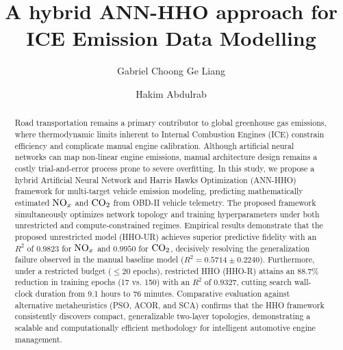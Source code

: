 \documentclass[runningheads]{llncs}
\begin{document}
\title{A hybrid ANN-HHO approach for ICE Emission Data Modelling}

\author{Gabriel Choong Ge Liang \and
Hakim Abdulrab}



\maketitle

\begin{abstract}
	Road transportation remains a primary contributor to global greenhouse gas emissions, where
	thermodynamic limits inherent to Internal Combustion Engines (ICE) constrain efficiency and
	complicate manual engine calibration. Although artificial neural networks can map non-linear
	engine emissions, manual architecture design remains a costly trial-and-error process prone
	to severe overfitting. In this study, we propose a hybrid Artificial Neural Network and Harris
	Hawks Optimization (ANN-HHO) framework for multi-target vehicle emission modeling, predicting
	mathematically estimated $\ce{NO_x}$ and $\ce{CO2}$ from OBD-II vehicle telemetry. The proposed
	framework simultaneously optimizes network topology and training hyperparameters under both
	unrestricted and compute-constrained regimes. Empirical results demonstrate that the proposed
	unrestricted model (HHO-UR) achieves superior predictive fidelity with an $R^2$ of $0.9823$ for
	$\ce{NO_x}$ and $0.9950$ for $\ce{CO2}$, decisively resolving the generalization failure observed
	in the manual baseline model ($R^2 = 0.5714 \pm 0.2240$). Furthermore, under a restricted
	budget ($\le 20$ epochs), restricted HHO (HHO-R) attains an $88.7\%$ reduction in training epochs
	(17 vs. 150) with an $R^2$ of $0.9327$, cutting search wall-clock duration from 9.1 hours to 76
	minutes. Comparative evaluation against alternative metaheuristics (PSO, ACOR, and SCA) confirms
	that the HHO framework consistently discovers compact, generalizable two-layer topologies,
	demonstrating a scalable and computationally efficient methodology for intelligent automotive engine management.
\end{abstract}
\end{document}
